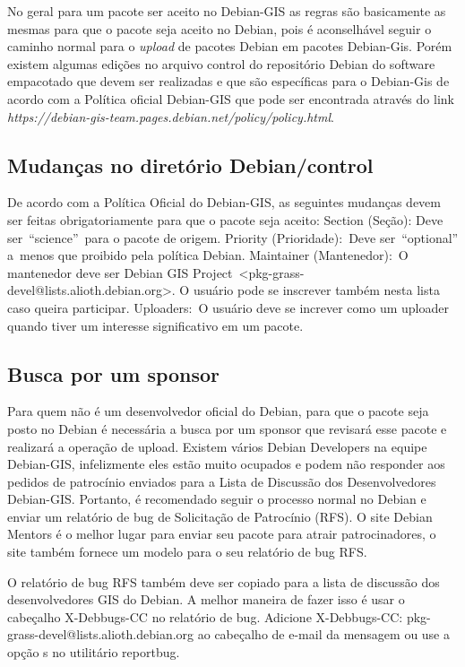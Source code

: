 No geral para um pacote ser aceito no Debian-GIS as regras são basicamente as mesmas para que o pacote seja aceito no Debian, pois é aconselhável seguir o caminho normal para o \textit{upload} de pacotes Debian em pacotes Debian-Gis. Porém existem algumas edições no arquivo control do repositório Debian do software empacotado que devem ser realizadas e que são específicas para o Debian-Gis de acordo com a Política oficial Debian-GIS que pode ser encontrada através do link \textit{https://debian-gis-team.pages.debian.net/policy/policy.html}.

\subsection{Mudanças no diretório Debian/control}

De acordo com a Política Oficial do Debian-GIS, as seguintes mudanças devem ser feitas obrigatoriamente para que o pacote seja aceito:
Section (Seção): Deve ser “science” para o pacote de origem.
Priority (Prioridade): Deve ser “optional” a menos que proibido pela política Debian.
Maintainer (Mantenedor): O mantenedor deve ser Debian GIS Project <pkg-grass-devel@lists.alioth.debian.org>. O usuário pode se inscrever também nesta lista caso queira participar.
Uploaders: O usuário deve se increver como um uploader quando tiver um interesse significativo em um pacote.

\subsection{Busca por um sponsor}

Para quem não é um desenvolvedor oficial do Debian, para que o pacote seja posto no Debian é necessária a busca por um sponsor que revisará esse pacote e realizará a operação de upload. Existem vários Debian Developers na equipe Debian-GIS, infelizmente eles estão muito ocupados e podem não responder aos pedidos de patrocínio enviados para a Lista de Discussão dos Desenvolvedores Debian-GIS. Portanto, é recomendado seguir o processo normal no Debian e enviar um relatório de bug de Solicitação de Patrocínio (RFS). O site Debian Mentors é o melhor lugar para enviar seu pacote para atrair patrocinadores, o site também fornece um modelo para o seu relatório de bug RFS.

O relatório de bug RFS também deve ser copiado para a lista de discussão dos desenvolvedores GIS do Debian. A melhor maneira de fazer isso é usar o cabeçalho X-Debbugs-CC no relatório de bug. Adicione X-Debbugs-CC: pkg-grass-devel@lists.alioth.debian.org ao cabeçalho de e-mail da mensagem ou use a opção s no utilitário reportbug.
